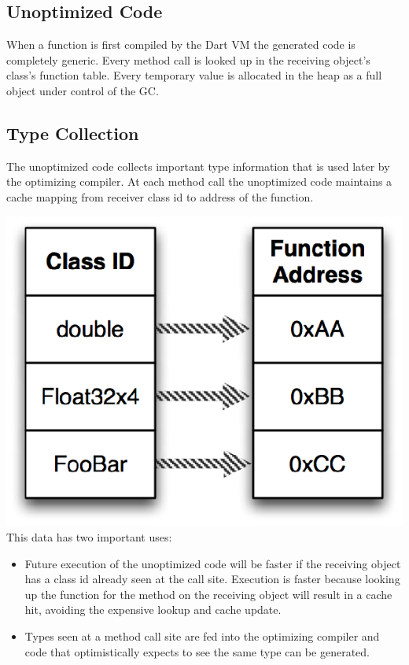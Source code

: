\documentclass[preprint]{sigplanconf}
\begin{document}
\subsection{Unoptimized Code}
When a function is first compiled by the Dart VM the generated code is completely generic. Every method call is looked up in the receiving object's class's function table. Every temporary value is allocated in the heap as a full object under control of the GC. 

\subsection{Type Collection}
The unoptimized code collects important type\cite{typefeedback} information that is used later by the optimizing compiler. At each method call the unoptimized code maintains a cache mapping from receiver class id to address of the function. 

\includegraphics{typecache.eps}
This data has two important uses:
\begin{itemize}
\item Future execution of the unoptimized code will be faster if the receiving object has a class id already seen at the call site. Execution is faster because looking up the function for the method on the receiving object will result in a cache hit, avoiding the expensive lookup and cache update.
\item Types seen at a method call site are fed into the optimizing compiler and code that optimistically expects to see the same type can be generated.
\end{itemize}
\end{document}
